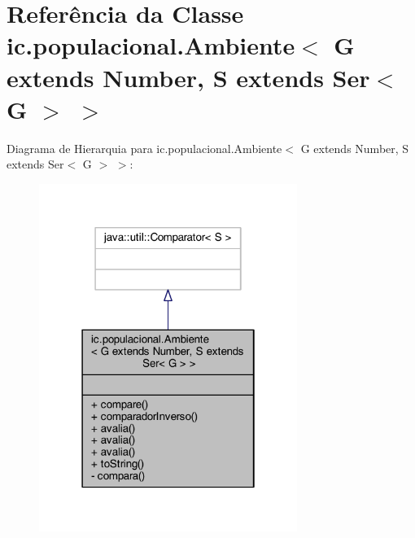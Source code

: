 \hypertarget{classic_1_1populacional_1_1_ambiente_3_01_g_01extends_01_number_00_01_s_01extends_01_ser_3_01_g_01_4_01_4}{\section{Referência da Classe ic.\-populacional.\-Ambiente$<$ G extends Number, S extends Ser$<$ G $>$ $>$}
\label{classic_1_1populacional_1_1_ambiente_3_01_g_01extends_01_number_00_01_s_01extends_01_ser_3_01_g_01_4_01_4}
}


Diagrama de Hierarquia para ic.\-populacional.\-Ambiente$<$ G extends Number, S extends Ser$<$ G $>$ $>$\-:\nopagebreak
\begin{figure}[H]
\begin{center}
\leavevmode
\includegraphics[width=238pt]{classic_1_1populacional_1_1_ambiente_3_01_g_01extends_01_number_00_01_s_01extends_01_ser_3_01_g_01_4_01_4__inherit__graph}
\end{center}
\end{figure}


